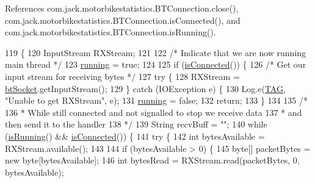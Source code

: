 References com.\+jack.\+motorbikestatistics.\+B\+T\+Connection.\+close(), com.\+jack.\+motorbikestatistics.\+B\+T\+Connection.\+is\+Connected(), and com.\+jack.\+motorbikestatistics.\+B\+T\+Connection.\+is\+Running().


\begin{DoxyCode}
119                       \{
120         InputStream RXStream;
121 
122         \textcolor{comment}{/* Indicate that we are now running main thread */}
123         \hyperlink{classcom_1_1jack_1_1motorbikestatistics_1_1_b_t_connection_a6193b7b92b7f2905a3a43d63db40aba8}{running} = \textcolor{keyword}{true};
124 
125         \textcolor{keywordflow}{if} (\hyperlink{classcom_1_1jack_1_1motorbikestatistics_1_1_b_t_connection_a22f33e46d9f460d78865d4c63b645357}{isConnected}()) \{
126             \textcolor{comment}{/* Get our input stream for receiving bytes */}
127             \textcolor{keywordflow}{try} \{
128                 RXStream = \hyperlink{classcom_1_1jack_1_1motorbikestatistics_1_1_b_t_connection_a0d47f94a35f7c8a07429975446e7b33b}{btSocket}.getInputStream();
129             \} \textcolor{keywordflow}{catch} (IOException e) \{
130                 Log.e(\hyperlink{classcom_1_1jack_1_1motorbikestatistics_1_1_b_t_connection_af9455991fec4de29ffc875eae117a761}{TAG}, \textcolor{stringliteral}{"Unable to get RXStream"}, e);
131                 \hyperlink{classcom_1_1jack_1_1motorbikestatistics_1_1_b_t_connection_a6193b7b92b7f2905a3a43d63db40aba8}{running} = \textcolor{keyword}{false};
132                 \textcolor{keywordflow}{return};
133             \}
134 
135             \textcolor{comment}{/*}
136 \textcolor{comment}{             * While still connected and not signalled to stop we receive data}
137 \textcolor{comment}{             * and then send it to the handler}
138 \textcolor{comment}{             */}
139             String recvBuff = \textcolor{stringliteral}{""};
140             \textcolor{keywordflow}{while} (\hyperlink{classcom_1_1jack_1_1motorbikestatistics_1_1_b_t_connection_a17b07494b0e7cba2e550054d7b47e309}{isRunning}() && \hyperlink{classcom_1_1jack_1_1motorbikestatistics_1_1_b_t_connection_a22f33e46d9f460d78865d4c63b645357}{isConnected}()) \{
141                 \textcolor{keywordflow}{try} \{
142                     \textcolor{keywordtype}{int} bytesAvailable = RXStream.available();
143 
144                     \textcolor{keywordflow}{if} (bytesAvailable > 0) \{
145                         byte[] packetBytes = \textcolor{keyword}{new} byte[bytesAvailable];
146                         \textcolor{keywordtype}{int} bytesRead = RXStream.read(packetBytes, 0, bytesAvailable);

\end{DoxyCode}

